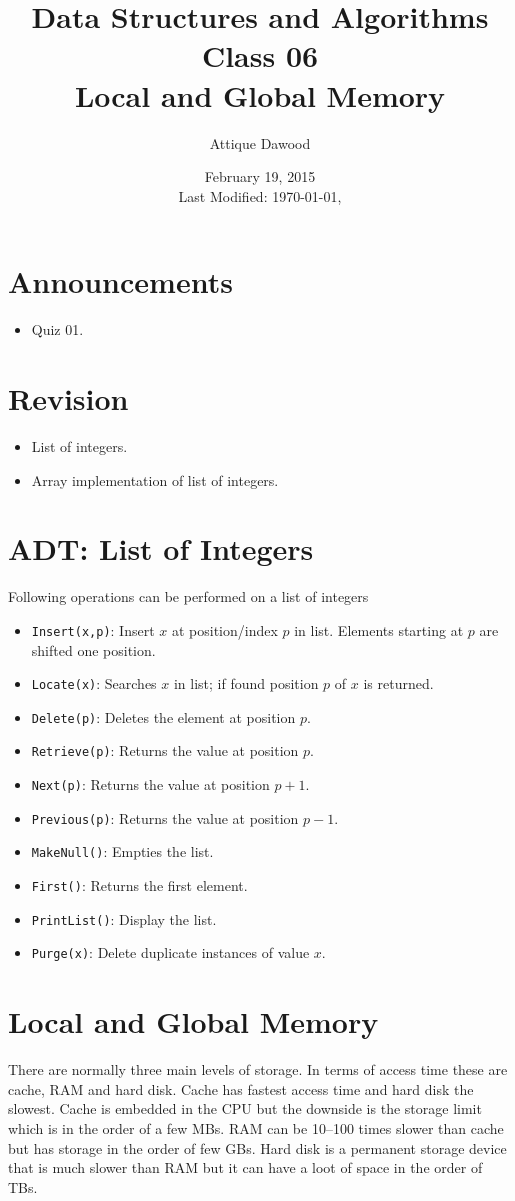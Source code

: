 \documentclass[12pt,a4paper]{article}
\title{Data Structures and Algorithms\\Class 06\\Local and Global Memory}
\author{Attique Dawood}
\date{February 19, 2015\\[0.2cm] Last Modified: \today, \currenttime}
\begin{document}
\maketitle
\section{Announcements}
\begin{itemize}
\item Quiz 01.
\end{itemize}
\section{Revision}
\begin{itemize}
\item List of integers.
\item Array implementation of list of integers.
\end{itemize}
\section{ADT: List of Integers}
Following operations can be performed on a list of integers
\begin{itemize}
\item \verb|Insert(x,p)|: Insert $x$ at position/index $p$ in list. Elements starting at $p$ are shifted one position.
\item \verb|Locate(x)|: Searches $x$ in list; if found position $p$ of $x$ is returned.
\item \verb|Delete(p)|: Deletes the element at position $p$.
\item \verb|Retrieve(p)|: Returns the value at position $p$.
\item \verb|Next(p)|: Returns the value at position $p+1$.
\item \verb|Previous(p)|: Returns the value at position $p-1$.
\item \verb|MakeNull()|: Empties the list.
\item \verb|First()|: Returns the first element.
\item \verb|PrintList()|: Display the list.
\item \verb|Purge(x)|: Delete duplicate instances of value $x$.
\end{itemize}
\section{Local and Global Memory}
There are normally three main levels of storage. In terms of access time these are cache, RAM and hard disk. Cache has fastest access time and hard disk the slowest. Cache is embedded in the CPU but the downside is the storage limit which is in the order of a few MBs. RAM can be 10--100 times slower than cache but has storage in the order of few GBs. Hard disk is a permanent storage device that is much slower than RAM but it can have a loot of space in the order of TBs.
\end{document}
